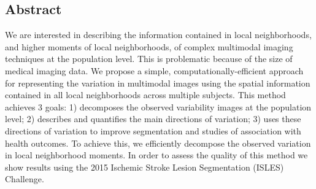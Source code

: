 \documentclass[a0,landscape]{a0poster}
\begin{document}
\vspace{1cm} %


\begin{multicols}{3} %


\color{black} %

\normalsize{\section*{{\color{uwred}Abstract}}}
\noindent We are interested in describing the information contained in local neighborhoods, and higher moments of local neighborhoods, of complex multimodal imaging techniques at the population level. This is problematic because of the size of medical imaging data. We propose a simple, computationally-efficient approach for representing the variation in multimodal images using the spatial information contained in all local neighborhoods across multiple subjects. This method achieves 3 goals: 1) decomposes the observed variability images at the population level; 2) describes and quantifies the main directions of variation; 3) uses these directions of variation to improve segmentation and studies of association with health outcomes. To achieve this, we efficiently decompose the observed variation in local neighborhood moments. In order to assess the quality of this method we show results using the 2015 Ischemic Stroke Lesion Segmentation (ISLES) Challenge.\vspace{.5cm}



\end{multicols}
\end{document}
